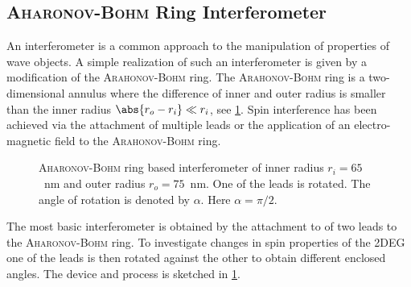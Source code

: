 \subsection{\textsc{Aharonov-Bohm} Ring Interferometer}
An interferometer is a common approach to the manipulation of properties of wave objects. A simple realization of such an interferometer is given by a modification of the \textsc{Arahonov-Bohm} ring. The \textsc{Arahonov-Bohm} ring is a two-dimensional annulus where the difference of inner and outer radius is smaller than the inner radius $\abs{r_o- r_i} \ll r_i$, see \cref{fig:aharonovbohmring}.
Spin interference has been achieved via the attachment of multiple leads \cite{PhysRevB.75.035304} or the application of an electro-magnetic field \cite{PhysRevB.69.155335} to the \textsc{Arahonov-Bohm} ring.\par
\begin{figure}[!h]
\centering
{}
\caption{\textsc{Aharonov-Bohm} ring based interferometer of inner radius $r_i=65$~nm and outer radius $r_o=75$~nm. One of the leads is rotated. The angle of rotation is denoted by $\alpha$. Here $\alpha=\pi/2$.}\label{fig:aharonovbohmring}
\end{figure}
The most basic interferometer is obtained by the attachment to of two leads to the \textsc{Aharonov-Bohm} ring. To investigate changes in spin properties of the 2DEG one of the leads is then rotated against the other to obtain different enclosed angles. The device and process is sketched in \cref{fig:aharonovbohmring}.
